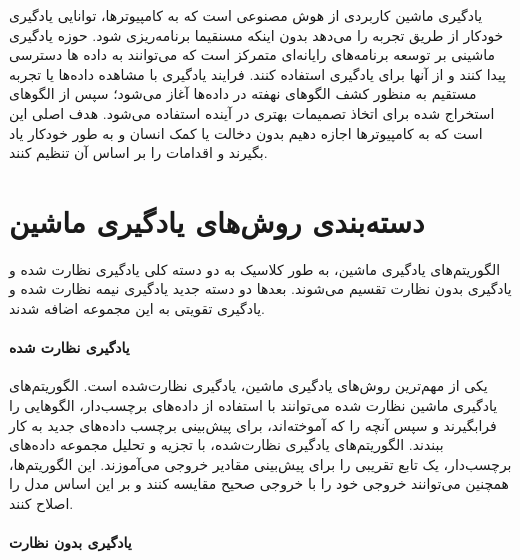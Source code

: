 


یادگیری ماشین کاربردی از هوش مصنوعی 
است که به کامپیوترها، توانایی یادگیری خودکار از طریق تجربه  را می‌دهد بدون اینکه مسنقیما برنامه‌ریزی شود. حوزه یادگیری ماشینی بر توسعه برنامه‌های رایانه‌ای متمرکز است که می‌توانند به داده ها دسترسی پیدا کنند و از آنها برای یادگیری استفاده کنند. فرایند یادگیری با مشاهده داده‌ها یا تجربه مستقیم  به منظور کشف الگوهای نهفته در داده‌ها آغاز می‌شود؛  سپس از الگوهای  استخراج شده برای اتخاذ تصمیمات بهتری در آینده استفاده می‌شود. هدف اصلی این است که به کامپیوترها اجازه دهیم بدون دخالت یا کمک انسان و به طور خودکار یاد بگیرند و اقدامات را بر اساس آن تنظیم کنند.

\section{دسته‌بندی روش‌های یادگیری ماشین}
الگوریتم‌های یادگیری ماشین، به طور کلاسیک به دو دسته کلی یادگیری نظارت شده و یادگیری بدون نظارت تقسیم می‌شوند. بعدها دو دسته جدید یادگیری نیمه نظارت شده و یادگیری تقویتی به این مجموعه اضافه شدند.
\paragraph{یادگیری نظارت شده}

یکی از مهم‌ترین روش‌های یادگیری ماشین، یادگیری نظارت‌شده است. الگوریتم‌های یادگیری ماشین نظارت ‌شده می‌توانند  با استفاده از داده‌های برچسب‌دار، الگوهایی  را فرابگیرند و سپس آنچه را که آموخته‌اند، برای پیش‌بینی برچسب داده‌های جدید به کار ببندند. الگوریتم‌های یادگیری نظارت‌شده، با تجزیه و تحلیل مجموعه داده‌های برچسب‌دار، یک تابع تقریبی را برای پیش‌بینی مقادیر خروجی می‌‌آموزند. این الگوریتم‌ها، همچنین می‌توانند خروجی خود را با خروجی صحیح مقایسه کنند و بر این اساس مدل را اصلاح کنند.

\paragraph{یادگیری بدون نظارت}

